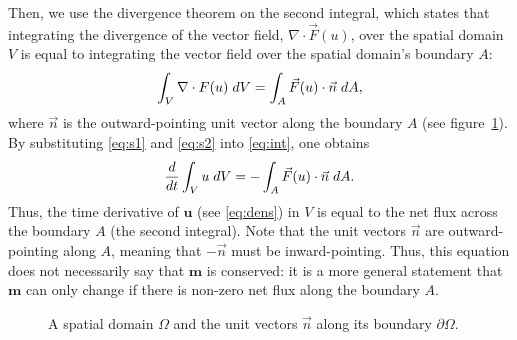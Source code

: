 \documentclass[12pt,a4]{article}
\begin{document}
Then, we use the divergence theorem on the second integral, which states that integrating the divergence of the vector field, $\nabla \cdot \vec F(u)$, over the spatial domain $V$ is equal to integrating the vector field over the spatial domain's boundary $A$:
\begin{gather}\label{eq:s2}
	\int_V \nabla\cdot F(u)\hspace*{0.10 cm} dV = \int_A \vec F( u) \cdot \vec n \hspace*{0.10 cm}dA,
\end{gather}
where $\vec n$ is the outward-pointing unit vector along the boundary $A$ (see figure~\ref{fig:domain}). By substituting \ref{eq:s1} and \ref{eq:s2} into \ref{eq:int}, one obtains
\begin{gather}\label{eq:cq}
	\frac{d}{dt} \int_V u \hspace*{0.10 cm} dV =- \int_A \vec F(u) \cdot \vec n \hspace*{0.10 cm}dA.
\end{gather}
Thus, the time derivative of $\mathbf{u}$ (see \ref{eq:dens}) in $V$ is equal to the net flux across the boundary $A$ (the second integral). Note that the unit vectors $\vec n$ are outward-pointing along $A$, meaning that $-\vec n$ must be inward-pointing. Thus, this equation does not necessarily say that $\mathbf{m}$ is conserved: it is a more general statement that $\mathbf{m}$ can only change if there is non-zero net flux along the boundary $A$.
\begin{figure}[h]
	\centering
	\caption{A spatial domain $\Omega$ and the unit vectors $\vec n$ along its boundary $\partial\Omega$.}
	\label{fig:domain}
\end{figure}
\end{document}

